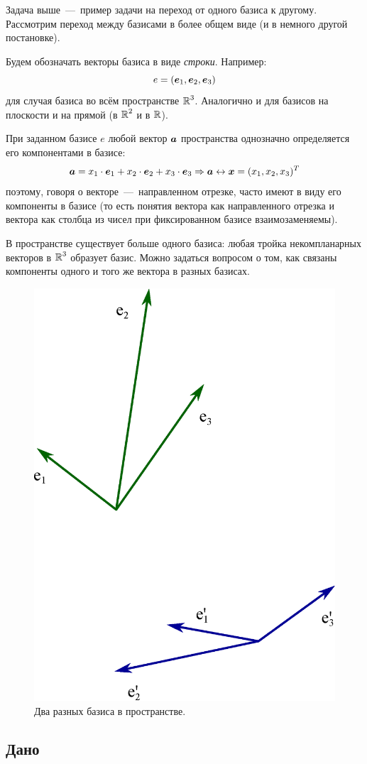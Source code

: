 \documentclass[a4paper,12pt]{article}
\begin{document}
  Задача выше~---~пример задачи на переход от одного базиса к другому.
  Рассмотрим переход между базисами в более общем виде (и в немного другой постановке).
  
  Будем обозначать векторы базиса в виде \emph{строки}.
  Например:
  \[
    e \hm= (\bds e_1, \bds e_2, \bds e_3)
  \]
  для случая базиса во всём пространстве $\operatorname{\mathbb R}^3$.
  Аналогично и для базисов на плоскости и на прямой (в $\operatorname{\mathbb R}^2$ и в $\operatorname{\mathbb R}$).
  
  При заданном базисе $e$ любой вектор $\boldsymbol a$ пространства однозначно определяется его компонентами в базисе:
  \[
    \boldsymbol a = x_1 \cdot \boldsymbol e_1 + x_2 \cdot \boldsymbol e_2 + x_3 \cdot \boldsymbol e_3
      \Rightarrow \boldsymbol a \leftrightarrow \boldsymbol x = (x_1, x_2, x_3)^T
  \]
  поэтому, говоря о векторе~---~направленном отрезке, часто имеют в виду его компоненты в базисе (то есть понятия вектора как направленного отрезка и вектора как столбца из чисел при фиксированном базисе взаимозаменяемы).
  
  В пространстве существует больше одного базиса: любая тройка некомпланарных векторов в $\operatorname{\mathbb R}^3$ образует базис.
  Можно задаться вопросом о том, как связаны компоненты одного и того же вектора в разных базисах.
  
  \begin{figure}[h]
    \centering
    
    \includegraphics[width=0.5\columnwidth]{two-basises}
    
    \caption{Два разных базиса в пространстве.}
    \label{fig:two-basises}
  \end{figure}
  
  
  \subsection*{Дано}
  
\end{document}
